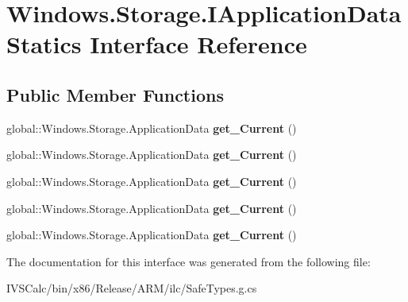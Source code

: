 \hypertarget{interface_windows_1_1_storage_1_1_i_application_data_statics}{}\section{Windows.\+Storage.\+I\+Application\+Data\+Statics Interface Reference}
\label{interface_windows_1_1_storage_1_1_i_application_data_statics}
\subsection*{Public Member Functions}
\begin{DoxyCompactItemize}
\item 
\mbox{\label{interface_windows_1_1_storage_1_1_i_application_data_statics_abb69b0889f3c9416bea64b27f5068874}} 
global\+::\+Windows.\+Storage.\+Application\+Data {\bfseries get\+\_\+\+Current} ()
\item 
\mbox{\label{interface_windows_1_1_storage_1_1_i_application_data_statics_abb69b0889f3c9416bea64b27f5068874}} 
global\+::\+Windows.\+Storage.\+Application\+Data {\bfseries get\+\_\+\+Current} ()
\item 
\mbox{\label{interface_windows_1_1_storage_1_1_i_application_data_statics_abb69b0889f3c9416bea64b27f5068874}} 
global\+::\+Windows.\+Storage.\+Application\+Data {\bfseries get\+\_\+\+Current} ()
\item 
\mbox{\label{interface_windows_1_1_storage_1_1_i_application_data_statics_abb69b0889f3c9416bea64b27f5068874}} 
global\+::\+Windows.\+Storage.\+Application\+Data {\bfseries get\+\_\+\+Current} ()
\item 
\mbox{\label{interface_windows_1_1_storage_1_1_i_application_data_statics_abb69b0889f3c9416bea64b27f5068874}} 
global\+::\+Windows.\+Storage.\+Application\+Data {\bfseries get\+\_\+\+Current} ()
\end{DoxyCompactItemize}


The documentation for this interface was generated from the following file\+:\begin{DoxyCompactItemize}
\item 
I\+V\+S\+Calc/bin/x86/\+Release/\+A\+R\+M/ilc/Safe\+Types.\+g.\+cs\end{DoxyCompactItemize}
